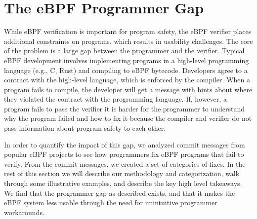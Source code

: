 \section{The eBPF Programmer Gap}
\label{sec:motivation}

While eBPF verification is important for program safety, the eBPF verifier
    places additional constraints on programs, which results in usability challenges.
The core of the problem is a large gap between the programmer and the
    verifier.
Typical eBPF development involves implementing programs in a high-level
    programming language (e.g., C, Rust) and compiling to eBPF bytecode.
Developers agree to a contract with the high-level language, which is
    enforced by the compiler.
When a program fails to compile, the developer will get a message with
    hints about where they violated
    the contract with the programming language.
If, however, a program fails to pass the verifier it is harder for the programmer
    to understand why the program failed and how to fix it because the compiler 
    and verifier do not pass information about program safety to each other.

In order to quantify the impact of this gap,
    we analyzed commit messages from popular eBPF projects to see how programmers fix
    eBPF programs that fail to verify.
From the commit messages, we created a set of categories of fixes.
In the rest of this section we will describe our methodology and categorization, walk through some illustrative examples, and describe the key high level takeaways.
We find that the programmer gap as described exists, and that it makes the eBPF system less usable through the need for unintuitive programmer workarounds.




